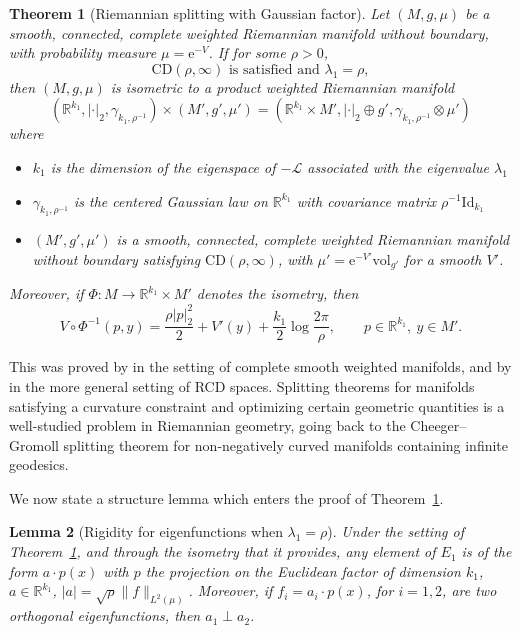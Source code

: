 \documentclass[10pt,reqno]{amsart}
\newtheorem{theorem}{Theorem}[section]
\newtheorem{lemma}[theorem]{Lemma}
\numberwithin{equation}{section}
\begin{document}
\begin{theorem}[Riemannian splitting with Gaussian
  factor] \label{thm_split_cz} Let $(M, g, \mu)$ be a smooth, connected,
  complete weighted Riemannian manifold without boundary, with probability
  measure $\mu=\mathrm{e}^{-V}$. If for some
  $\rho>0$,
  \begin{equation}
  \text{$\mathrm{CD}(\rho, \infty)$ is satisfied and $\lambda_1=\rho$}, 
  \end{equation}
  then $(M,g, \mu)$ is isometric to a product weighted Riemannian manifold 
  \begin{equation}
    (\mathbb{R}^{k_1},\left|\cdot\right|_2,\gamma_{k_1,\rho^{-1}})\times (M',g',\mu')
    =(\mathbb{R}^{k_1} \times M',\left|\cdot\right|_2 \oplus g', \gamma_{k_1,\rho^{-1}} \otimes \mu')
  \end{equation}
  where 
  \begin{itemize}
  \item $k_1$ is the dimension of the eigenspace of $-\mathcal{L}$ associated with the eigenvalue $\lambda_1$
  \item $\gamma_{k_1,\rho^{-1}}$ is the centered Gaussian law on
    $\mathbb{R}^{k_1}$ with covariance matrix $\rho^{-1}\mathrm{Id}_{k_1}$
  \item $(M', g', \mu')$ is a smooth, connected, complete weighted Riemannian manifold without boundary satisfying $\mathrm{CD}(\rho, \infty)$,
    with $\mu'=\mathrm{e}^{-V'}\mathrm{vol}_{g'}$ for a smooth $V'$.
  \end{itemize}
  Moreover, if $\Phi:M\to\mathbb{R}^{k_1}\times M'$ denotes the isometry, then
  \[
    V\circ\Phi^{-1}(p,y)=\frac{\rho\left|p\right|_2^2}{2}+V'(y)+\frac{k_1}{2}\log\frac{2\pi}{\rho},
    \qquad p\in\mathbb{R}^{k_1},\ y\in M'.
  \]
\end{theorem}

This was proved by \cite{CZ17} in the setting
of complete smooth weighted manifolds, and by \cite{GKKO20} in the more general setting
of RCD spaces. Splitting theorems for manifolds satisfying a curvature
constraint and optimizing certain geometric quantities is a well-studied
problem in Riemannian geometry, going back to the Cheeger--Gromoll
splitting theorem for non-negatively curved manifolds containing infinite
geodesics.

We now state a structure lemma which enters the proof of Theorem~\ref{thm_split_cz}. %

\begin{lemma}[Rigidity for eigenfunctions when $\lambda_1 =
  \rho$] \label{lem_rig} Under the setting of Theorem~\ref{thm_split_cz}, and
  through the isometry that it provides, any element of $E_1$ is of the form
  $a \cdot p(x) $ with $p$ the projection on the Euclidean factor of dimension
  $k_1$, $a \in \mathbb{R}^{k_1}$, $|a| = \sqrt{\rho}\|f\|_{L^2(\mu)}$. Moreover, if
  $f_i = a_i \cdot p(x)$, for $i=1,2$, are two orthogonal eigenfunctions, then
  $a_1\perp a_2$.
\end{lemma}
\end{document}
